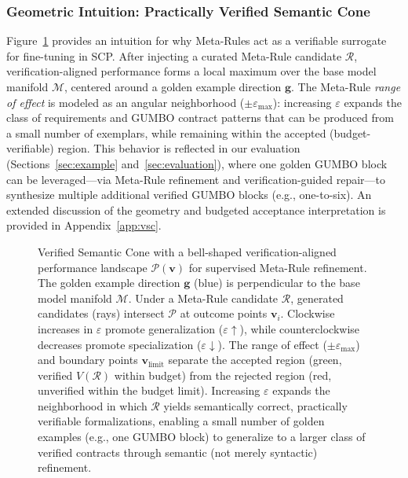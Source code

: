 \documentclass[conference]{IEEEtran}
\begin{document}
\subsubsection{Geometric Intuition: Practically Verified Semantic Cone}
\label{sec:vsc-intuition}

Figure~\ref{fig:vsc} provides an intuition for why Meta-Rules act as a verifiable surrogate for fine-tuning in SCP. After injecting a curated Meta-Rule candidate $\mathcal{R}$, verification-aligned performance forms a local maximum over the base model manifold $\mathcal{M}$, centered around a golden example direction $\mathbf{g}$. The Meta-Rule \emph{range of effect} is modeled as an angular neighborhood ($\pm\varepsilon_{\max}$): increasing $\varepsilon$ expands the class of requirements and GUMBO contract patterns that can be produced from a small number of exemplars, while remaining within the accepted (budget-verifiable) region. This behavior is reflected in our evaluation (Sections~\ref{sec:example} and~\ref{sec:evaluation}), where one golden GUMBO block can be leveraged—via Meta-Rule refinement and verification-guided repair—to synthesize multiple additional verified GUMBO blocks (e.g., one-to-six). An extended discussion of the geometry and budgeted acceptance interpretation is provided in Appendix~\ref{app:vsc}.

\begin{figure}[t]
\centering

\caption{Verified Semantic Cone with a bell-shaped verification-aligned performance landscape $\mathcal{P}(\mathbf{v})$ for supervised Meta-Rule refinement. The golden example direction $\mathbf{g}$ (blue) is perpendicular to the base model manifold $\mathcal{M}$. Under a Meta-Rule candidate $\mathcal{R}$, generated candidates (rays) intersect $\mathcal{P}$ at outcome points $\mathbf{v}_i$. Clockwise increases in $\varepsilon$ promote generalization ($\varepsilon\uparrow$), while counterclockwise decreases promote specialization ($\varepsilon\downarrow$). The range of effect ($\pm\varepsilon_{\max}$) and boundary points $\mathbf{v}_{\text{limit}}$ separate the accepted region (green, verified $V(\mathcal{R})$ within budget) from the rejected region (red, unverified within the budget limit). Increasing $\varepsilon$ expands the neighborhood in which $\mathcal{R}$ yields semantically correct, practically verifiable formalizations, enabling a small number of golden examples (e.g., one GUMBO block) to generalize to a larger class of verified contracts through semantic (not merely syntactic) refinement.}
\label{fig:vsc}
\end{figure}
\end{document}
